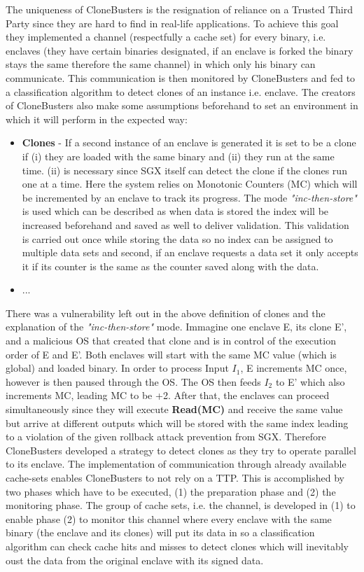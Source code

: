 The uniqueness of CloneBusters is the resignation of reliance on a Trusted Third Party since they are hard to find in real-life applications. To achieve this goal they implemented a channel (respectfully a cache set) for every binary, i.e. enclaves (they have certain binaries designated, if an enclave is forked the binary stays the same therefore the same channel) in which only his binary can communicate. This communication is then monitored by CloneBusters and fed to a classification algorithm to detect clones of an instance i.e. enclave. The creators of CloneBusters also make some assumptions beforehand to set an environment in which it will perform in the expected way: 

\begin{itemize}
    \item \textbf{Clones} - If a second instance of an enclave is generated it is set to be a clone if (i) they are loaded with the same binary and (ii) they run at the same time. (ii) is necessary since SGX itself can detect the clone if the clones run one at a time. Here the system relies on Monotonic Counters (MC) which will be incremented by an enclave to track its progress. The mode \textit{"inc-then-store"} is used which can be described as when data is stored the index will be increased beforehand and saved as well to deliver validation. This validation is carried out once while storing the data so no index can be assigned to multiple data sets and second, if an enclave requests a data set it only accepts it if its counter is the same as the counter saved along with the data.
    \item ...
\end{itemize} 

There was a vulnerability left out in the above definition of clones and the explanation of the \textit{"inc-then-store"} mode. Immagine one enclave E, its clone E', and a malicious OS that created that clone and is in control of the execution order of E and E'. Both enclaves will start with the same MC value (which is global) and loaded binary. In order to process Input \(I_1\), E increments MC once, however is then paused through the OS. The OS then feeds \(I_2\) to E' which also increments MC, leading MC to be +2. After that, the enclaves can proceed simultaneously since they will execute \textbf{Read(MC)} and receive the same value but arrive at different outputs which will be stored with the same index leading to a violation of the given rollback attack prevention from SGX. Therefore CloneBusters developed a strategy to detect clones as they try to operate parallel to its enclave. The implementation of communication through already available cache-sets enables CloneBusters to not rely on a TTP. This is accomplished by two phases which have to be executed, (1) the preparation phase and (2) the monitoring phase. The group of cache sets, i.e. the channel, is developed in (1) to enable phase (2) to monitor this channel where every enclave with the same binary (the enclave and its clones) will put its data in so a classification algorithm can check cache hits and misses to detect clones which will inevitably oust the data from the original enclave with its signed data.

